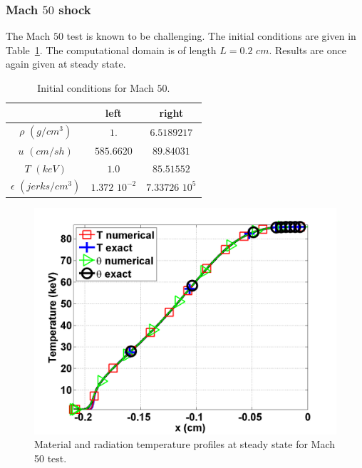 \documentclass[review]{elsarticle}
\newcommand{\tbl}[1]{Table~\ref{#1}}                     %
\begin{document}
\subsubsection{Mach $50$ shock} 

The Mach $50$ test is known to be challenging. The initial conditions are given in \tbl{tbl:table7}. The computational domain is of length $L=0.2$ $cm$. Results are once again given at steady state.
\begin{table}[H]
\caption{\label{tbl:table7} Initial conditions for Mach $50$.}
\begin{center}
\begin{tabular}{|c|c|c|}
\hline 
 & left  & right \\ \hline
$\rho$ $(g/cm^3)$ &$1.$ & $6.5189217$ \\ \hline
$u$ $(cm/sh)$& $585.6620$ & $89.84031$ \\ \hline
$T$ $(keV)$& $1.0$ & $85.51552$\\ \hline
$\epsilon$ $(jerks/cm^3)$ & $1.372$ $10^{-2}$ & $7.33726$ $10^{5}$\\
\hline
\end{tabular}  
\end{center}  
\end{table}
\begin{figure}[H]
                \centering
                \includegraphics[width=\textwidth]{Mach_50_nel_1000_temperature.png}
        \caption{Material and radiation temperature profiles at steady state for Mach 50 test.}\label{fig:Mach50_temp}
\end{figure}
\end{document}
